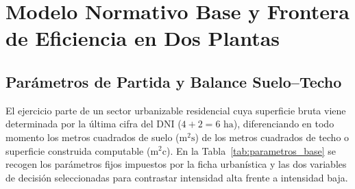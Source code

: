 \section{Modelo Normativo Base y Frontera de Eficiencia en Dos Plantas}
\label{sec:modelo_normativo}

\subsection{Parámetros de Partida y Balance Suelo--Techo}
\label{sub:specs_sector}

El ejercicio parte de un sector urbanizable residencial cuya superficie bruta viene determinada por la última cifra del DNI ($4 + 2 = 6\text{ ha}$), diferenciando en todo momento los metros cuadrados de suelo ($\text{m}^2\text{s}$) de los metros cuadrados de techo o superficie construida computable ($\text{m}^2\text{c}$). En la Tabla~\ref{tab:parametros_base} se recogen los parámetros fijos impuestos por la ficha urbanística y las dos variables de decisión seleccionadas para contrastar intensidad alta frente a intensidad baja.

\begin{table}[htbp]
  \centering
  \caption{Parámetros fijos del sector y equivalencia terminológica normativa.}
  \label{tab:parametros_base}
\end{table}

